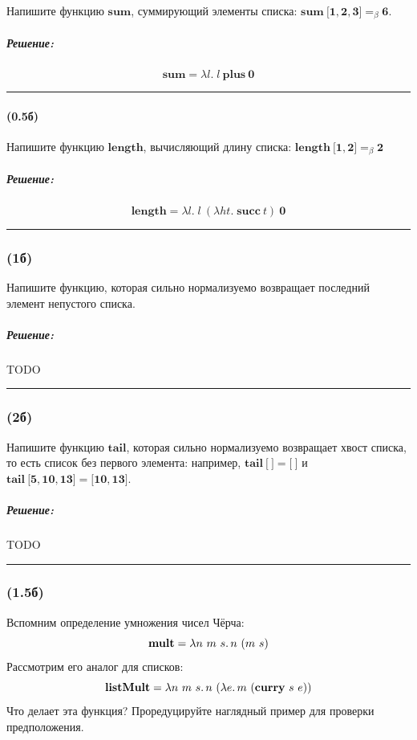 \documentclass{article}
\newenvironment{proof}{\subparagraph{\hspace{-1em}Решение:\newline}}{\par\noindent\rule{\textwidth}{0.4pt}}
\newcommand{\term}[1]{\mathbf{#1}}
\newcommand{\ap}{~}
\newcommand{\eqbeta}{=_\beta}
\newcommand{\tlist}[1]{\term{[}#1\term{]}} %
\begin{document}
    Напишите функцию $\term{sum}$, суммирующий элементы списка: $\term{sum} \ap \tlist{\term{1}, \term{2}, \term{3}} \eqbeta \term{6}$.

    \begin{proof}
        \[
            \term{sum} = \lambda l.\; l~\term{plus}~\term{0}
        \]
    \end{proof}

    \paragraph{(0.5б)}

    Напишите функцию $\term{length}$, вычисляющий длину списка: $\term{length} \ap \tlist{\term{1}, \term{2}} \eqbeta \term{2}$

    \begin{proof}
        \[
            \term{length} = \lambda l.\; l~(\lambda h t.\; \term{succ}~t)~\term{0}
        \]
    \end{proof}

    \subsubsection{(1б)}

    Напишите функцию, которая сильно нормализуемо возвращает последний элемент непустого списка.

    \begin{proof}
        TODO %
    \end{proof}

    \subsubsection{(2б)}

    Напишите функцию $\term{tail}$, которая сильно нормализуемо возвращает хвост списка, то есть список без первого элемента: например, $\term{tail}~\tlist{~} = \tlist{~}$ и $\term{tail}~\tlist{\term{5},\term{10},\term{13}} = \tlist{\term{10}, \term{13}}$.

    \begin{proof}
        TODO %
    \end{proof}

    \subsubsection{(1.5б)}

    Вспомним определение умножения чисел Чёрча:
    \[\term{mult} = \lambda n~m~s\ldotp n~(m~s)\]
    Рассмотрим его аналог для списков:
    \[\term{listMult} = \lambda n~m~s\ldotp n~(\lambda e\ldotp m~(\term{curry}~s~e))\]
    Что делает эта функция?
    Проредуцируйте наглядный пример для проверки предположения.
\end{document}

